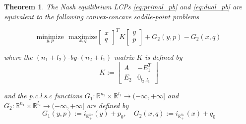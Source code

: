 \documentclass{article} %
\newtheorem{theorem}{Theorem} \newtheorem{lemma}[theorem]{Lemma}
\begin{document}
\begin{theorem}
  The Nash equilibrium LCPs \eqref{eq:primal_pb} and
  \eqref{eq:dual_pb} are equivalent to the following convex-concave
  saddle-point problems
  
  \begin{equation}
    \underset{y, p}{\text{minimize}}\text{ }\underset{x, q}{\text{maximize}}
           {\begin{bmatrix}x\\q\end{bmatrix}^TK\begin{bmatrix}y\\p\end{bmatrix} + G_2(y, p) - G_2(x, q)}
           \label{eq:unconstrained_pb}
  \end{equation}

  where the $(n_1 + l_2)$-by-$(n_2 + l_1)$ matrix $K$ is defined by
  \begin{equation}
    K :=
    \left[
      \begin{array}{cc}
        A & -E_1^T \\
        E_2 & 0_{l_2, l_1}
      \end{array}
      \right]
\end{equation}

and the p.c.l.s.c functions $G_1: \mathbb{R}^{n_2} \times \mathbb{R}^{l_1} \rightarrow (-\infty, +\infty]$ and \\$G_2: \mathbb{R}^{n_1} \times \mathbb{R}^{l_2} \rightarrow (-\infty, +\infty]$ are defined by
  \begin{equation}
      G_1(y, p) := i_{\mathbb{R}^{n_2}_+}(y) + p_0, \hspace{1em} G_2(x, q) := i_{\mathbb{R}^{n_1}_+}(x) + q_0
    \label{eq:things}
  \end{equation}
  

  \label{thm:pd}
\end{theorem}
\end{document}
